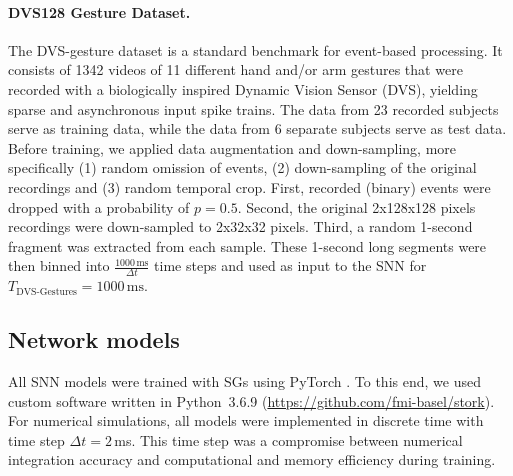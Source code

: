 \documentclass[11pt,a4paper]{article}
\begin{document}
\paragraph{DVS128 Gesture Dataset.} 
The DVS-gesture dataset \citep{Amir2017-ks} is a standard benchmark for event-based processing. 
It consists of 1342 videos of 11 different hand and/or arm gestures that were recorded with a biologically inspired Dynamic Vision Sensor (DVS), yielding sparse and asynchronous input spike trains. 
The data from 23 recorded subjects serve as training data, while the data from 6 separate subjects serve as test data. 
Before training, we applied data augmentation and down-sampling, more specifically (1) random omission of events, (2) down-sampling of the original recordings and (3) random temporal crop. 
First, recorded (binary) events were dropped with a probability of $p=0.5$. 
Second, the original 2x128x128 pixels recordings were down-sampled to 2x32x32 pixels.
Third, a random 1-second fragment was extracted from each sample. These 1-second long segments were then binned into $\frac{1000\,\text{ms}}{\Delta t}$ time steps and used as input to the SNN for $T_{\text{DVS-Gestures}}=1000\,\text{ms}$.


\subsection*{Network models}

All \ac{SNN} models were trained with \acp{SG} using PyTorch \citep{NEURIPS2019_9015}. To
this end, we used custom software written in Python~3.6.9 (\href{https://github.com/fmi-basel/stork}{https://github.com/fmi-basel/stork}). 
For numerical simulations, all models were implemented in discrete time with time step $\Delta t = 2$\,ms.
This time step was a compromise between numerical integration accuracy and computational and memory efficiency during training.
\end{document}
